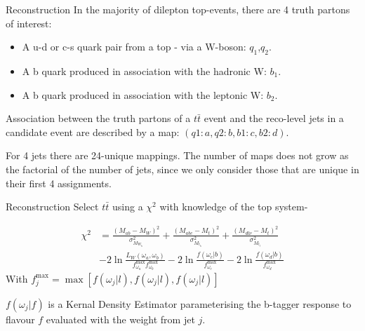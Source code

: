 \documentclass{beamer}
\begin{document}
\begin{frame}{Reconstruction}
  In the majority of dilepton top-events, there are 4 truth partons of interest:
  \begin{itemize}
    \item A u-d or c-s quark pair from a top - via a W-boson: $q_{1}$,$q_{2}$.
    \item A b quark produced in association with the hadronic W: $b_{1}$.
    \item A b quark produced in association with the leptonic W: $b_{2}$.
  \end{itemize}
  Association between the truth partons of a $t \bar{t}$ event and the reco-level jets in a candidate event are described by a map: $\left(q1:a, q2:b, b1:c, b2:d\right)$.

  For 4 jets there are 24-unique mappings. The number of maps does not grow as the factorial of the number of jets, since we only consider those that are unique in their first 4 assignments.
\end{frame}

\begin{frame}{Reconstruction}
Select $t\bar{t}$ using a $\chi^2$ with knowledge of the top system-

\begin{equation}\begin{split}
  \chi^2 &= \frac{\left(M_{ab} - M_W\right)^2}{\sigma^2_{M_{W_h}}} + \frac{\left(M_{abc} - M_t\right)^2}{\sigma^2_{M_{t_h}}} + \frac{\left(M_{dl\nu} - M_t\right)^2}{\sigma^2_{M_{t_l}}} \\
  &-2\ln{\frac{L_{W}\left( \omega_{a},\omega_{b} \right)}{f^{\text{max}}_{\omega_a} f^{\text{max}}_{\omega_b}}} -2\ln{\frac{f\left(\omega_{c} \big| b\right)}{f^{\text{max}}_{\omega_{c}}}} -2\ln{\frac{f\left(\omega_{d} \big| b\right)}{f^{\text{max}}_{\omega_{d}}}}
\end{split}\end{equation}
With $f^{\text{max}}_j = \max\left[f\left(\omega_{j} \big| l\right), f\left(\omega_{j} \big| l\right), f\left(\omega_{j} \big| l\right)\right]$

$f\left( \omega_{j} \big| f\right)$ is a Kernal Density Estimator parameterising the b-tagger response to flavour $f$ evaluated with the weight from jet $j$.
\end{frame}
\end{document}
